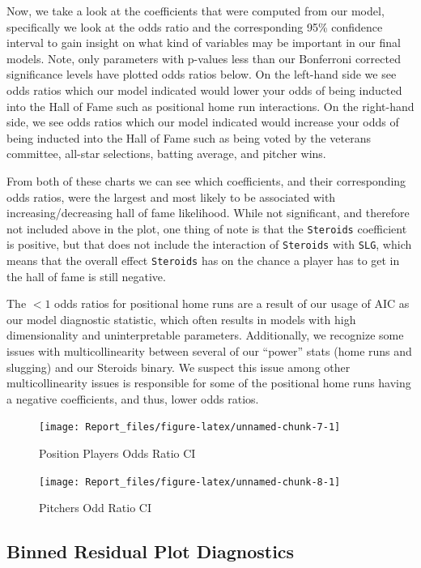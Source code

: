 \documentclass[
]{article}
\begin{document}
Now, we take a look at the coefficients that were computed from our
model, specifically we look at the odds ratio and the corresponding 95\%
confidence interval to gain insight on what kind of variables may be
important in our final models. Note, only parameters with p-values less
than our Bonferroni corrected significance levels have plotted odds
ratios below. On the left-hand side we see odds ratios which our model
indicated would lower your odds of being inducted into the Hall of Fame
such as positional home run interactions. On the right-hand side, we see
odds ratios which our model indicated would increase your odds of being
inducted into the Hall of Fame such as being voted by the veterans
committee, all-star selections, batting average, and pitcher wins.

From both of these charts we can see which coefficients, and their
corresponding odds ratios, were the largest and most likely to be
associated with increasing/decreasing hall of fame likelihood. While not
significant, and therefore not included above in the plot, one thing of
note is that the \texttt{Steroids} coefficient is positive, but that
does not include the interaction of \texttt{Steroids} with \texttt{SLG},
which means that the overall effect \texttt{Steroids} has on the chance
a player has to get in the hall of fame is still negative.

The \(< 1\) odds ratios for positional home runs are a result of our
usage of AIC as our model diagnostic statistic, which often results in
models with high dimensionality and uninterpretable parameters.
Additionally, we recognize some issues with multicollinearity between
several of our ``power'' stats (home runs and slugging) and our Steroids
binary. We suspect this issue among other multicollinearity issues is
responsible for some of the positional home runs having a negative
coefficients, and thus, lower odds ratios.

\begin{figure}
\texttt{[image: Report\_files/figure-latex/unnamed-chunk-7-1]} \caption{Position Players Odds Ratio CI}\label{fig:unnamed-chunk-7}
\end{figure}

\begin{figure}
\texttt{[image: Report\_files/figure-latex/unnamed-chunk-8-1]} \caption{Pitchers Odd Ratio CI}\label{fig:unnamed-chunk-8}
\end{figure}

\hypertarget{binned-residual-plot-diagnostics}{%
\subsection{Binned Residual Plot
Diagnostics}\label{binned-residual-plot-diagnostics}}
\end{document}
